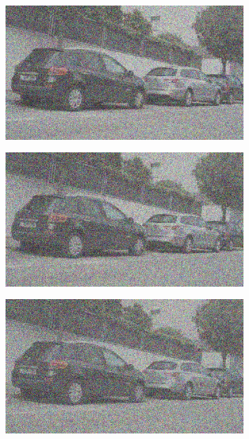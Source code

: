 \documentclass[a4paper]{ctexart}
\begin{document}
\begin{figure}[htbp]
\begin{subfigure}{0.08\textwidth}
			\label{fig：Gamma=0.9, Gauss Noise = 0.7}
		\end{subfigure}
		\begin{subfigure}{0.08\textwidth}
			\captionsetup{font=scriptsize}
			\includegraphics[width=\linewidth]{picture/Edge Detection/degrade/RGB_001 Gamma=0.9, Gauss Noise=0.8}
			\label{fig：Gamma=0.9, Gauss Noise = 0.8}
		\end{subfigure}
		\begin{subfigure}{0.08\textwidth}
			\captionsetup{font=scriptsize}
			\includegraphics[width=\linewidth]{picture/Edge Detection/degrade/RGB_001 Gamma=0.9, Gauss Noise=0.9}
			\label{fig：Gamma=0.9, Gauss Noise = 0.9}
		\end{subfigure}
		\begin{subfigure}{0.08\textwidth}
			\captionsetup{font=scriptsize}
			\includegraphics[width=\linewidth]{picture/Edge Detection/degrade/RGB_001 Gamma=0.9, Gauss Noise=1.0}

\end{subfigure}
\end{figure}
\end{document}
